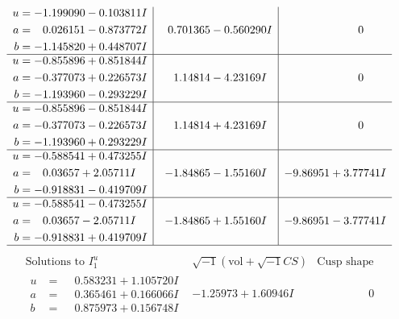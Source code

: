 \documentclass[1p]{elsarticle_modified}
\theoremstyle{definition}
\newcommand{\I}{\sqrt{-1}}
\begin{document}
$$\begin{array}{c|c|c}
\begin{aligned}
u &= -1.199090 - 0.103811 I \\
a &= \phantom{-}0.026151 - 0.873772 I \\
b &= -1.145820 + 0.448707 I\end{aligned}
 & \phantom{-}0.701365 - 0.560290 I & \phantom{-0.000000 } 0 \\ \hline\begin{aligned}
u &= -0.855896 + 0.851844 I \\
a &= -0.377073 + 0.226573 I \\
b &= -1.193960 - 0.293229 I\end{aligned}
 & \phantom{-}1.14814 - 4.23169 I & \phantom{-0.000000 } 0 \\ \hline\begin{aligned}
u &= -0.855896 - 0.851844 I \\
a &= -0.377073 - 0.226573 I \\
b &= -1.193960 + 0.293229 I\end{aligned}
 & \phantom{-}1.14814 + 4.23169 I & \phantom{-0.000000 } 0 \\ \hline\begin{aligned}
u &= -0.588541 + 0.473255 I \\
a &= \phantom{-}0.03657 + 2.05711 I \\
b &= -0.918831 - 0.419709 I\end{aligned}
 & -1.84865 - 1.55160 I & -9.86951 + 3.77741 I \\ \hline\begin{aligned}
u &= -0.588541 - 0.473255 I \\
a &= \phantom{-}0.03657 - 2.05711 I \\
b &= -0.918831 + 0.419709 I\end{aligned}
 & -1.84865 + 1.55160 I & -9.86951 - 3.77741 I\\
 \hline 
 \end{array}$$\newpage$$\begin{array}{c|c|c}  
\text{Solutions to }I^u_{1}& \I (\text{vol} + \sqrt{-1}CS) & \text{Cusp shape}\\
 \hline 
\begin{aligned}
u &= \phantom{-}0.583231 + 1.105720 I \\
a &= \phantom{-}0.365461 + 0.166066 I \\
b &= \phantom{-}0.875973 + 0.156748 I\end{aligned}
 & -1.25973 + 1.60946 I & \phantom{-0.000000 } 0 \\ \hline\begin{aligned}

\end{aligned}
\end{array}$$
\end{document}
